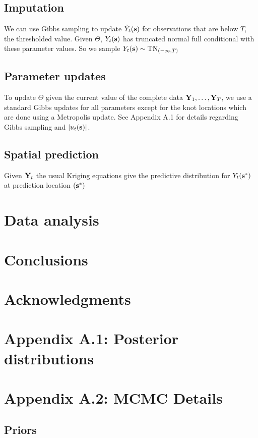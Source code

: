 \documentclass[11pt]{article}
\begin{document}
\subsection{Imputation}\label{s:impute}
We can use Gibbs sampling to update ${\tilde Y}_t(\mbox{\bf s})$ for observations that are below $T$, the thresholded value. Given $\Theta$, $Y_t(\mbox{\bf s})$ has truncated normal full conditional with these parameter values.
So we sample $Y_t(\mbox{\bf s}) \sim \text{TN}_{(-\infty, T)}$

\subsection{Parameter updates}\label{s:params}
To update $\Theta$ given the current value of the complete data $\mbox{\bf Y}_1, \ldots, \mbox{\bf Y}_T$, we use a standard Gibbs updates for all parameters except for the knot locations which are done using a Metropolis update.
See Appendix A.1 for details regarding Gibbs sampling and $|u_t(\mbox{\bf s})|$.

\subsection{Spatial prediction}\label{s:pred}
Given $\mbox{\bf Y}_t$ the usual Kriging equations give the predictive distribution for $Y_t(\mbox{\bf s}^*)$ at prediction location $(\mbox{\bf s}^*)$


\section{Data analysis}\label{s:analysis}


\section{Conclusions}\label{s:con}

\section*{Acknowledgments}

\section*{Appendix A.1: Posterior distributions}




\section*{Appendix A.2: MCMC Details}

\subsection*{Priors}





\end{document}
